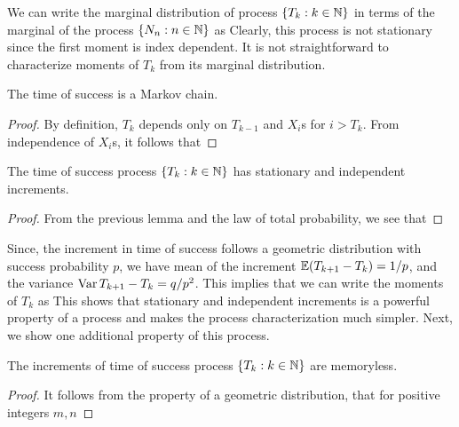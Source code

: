 \documentclass[a4paper,10pt,english]{article}
\begin{document}
We can write the marginal distribution of process $\{T_k: k \in \mathbb{N}\}$ in terms of the marginal of the process $\{N_n: n \in \mathbb{N}\}$ as
Clearly, this process is not stationary since the first moment is index dependent. 
It is not straightforward to characterize moments of $T_k$ from its marginal distribution. 
\begin{lem} The time of success is a Markov chain.
\end{lem}
\begin{proof} 
By definition, $T_k$ depends only on $T_{k-1}$ and $X_i$s for $i > T_k$. 
From independence of $X_i$s, it follows that 
\end{proof}
\begin{cor} The time of success process $\{T_k: k \in \mathbb{N}\}$ has stationary and independent increments. 
\end{cor}
\begin{proof} 
From the previous lemma and the law of total probability, we see that 
\end{proof}
Since, the increment in time of success follows a geometric distribution with success probability $p$, 
we have mean of the increment $\mathbb{E}(T_{k+1} - T_k) = 1/p$, and the variance $\operatorname{Var}{T_{k+1}-T_k} = {q}/{p^2}$. 
This implies that we can write the moments of $T_k$ as
This shows that stationary and independent increments is a powerful property of a process and makes the process characterization much simpler. 
Next, we show one additional property of this process. 
\begin{lem}
The increments of time of success process $\{T_k: k \in \mathbb{N}\}$ are memoryless. 
\end{lem}
\begin{proof} 
It follows from the property of a geometric distribution, that for positive integers $m,n$
\end{proof}
\end{document}
